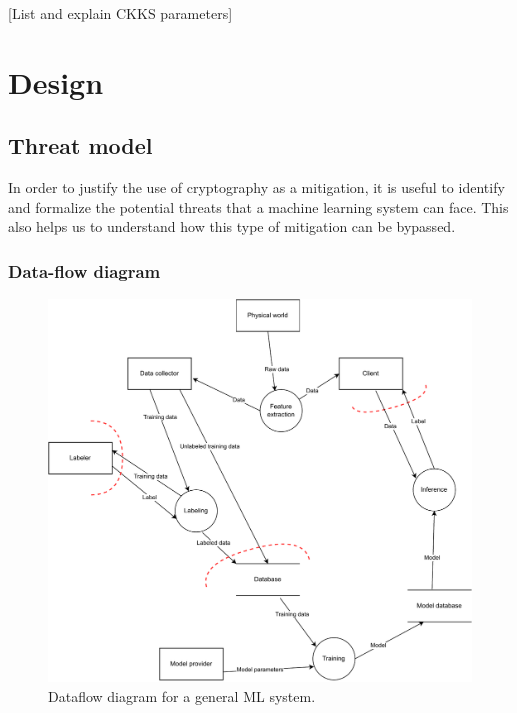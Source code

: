 \documentclass[a4paper,11pt,oneside]{report}
\begin{document}
[List and explain CKKS parameters]


\chapter{Design}



\section{Threat model}

In order to justify the use of cryptography as a mitigation, it is useful to identify and formalize the potential threats that a machine learning system can face. This also helps us to understand how this type of mitigation can be bypassed.

\subsection{Data-flow diagram}

\begin{figure}[t]
    \centering
    \includegraphics[width=\textwidth]{figures/dataflow-ml.pdf}
    \caption{Dataflow diagram for a general ML system.}
    \label{fig:dataflow}
\end{figure}
\end{document}
